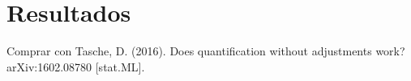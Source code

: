 \chapter{Resultados}\label{resultados}

Comprar con Tasche, D. (2016). Does quantification without adjustments work?
arXiv:1602.08780 [stat.ML].